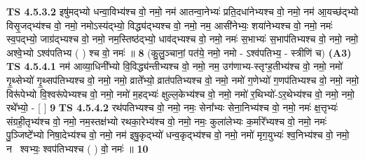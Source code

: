 \documentclass[17pt]{extarticle}
\begin{document}
                  \newline
                                \textbf{ TS 4.5.3.2} \newline
                  इषु॑मद्भ्यो धन्वा॒विभ्य॑श्च वो॒ नमो॒                  नम॑ आतन्वा॒नेभ्यः॑ प्रति॒दधा॑नेभ्यश्च वो॒ नमो॒                                     नम॑ आ॒यच्छ॑द्भ्यो विसृ॒जद्भ्य॑श्च वो॒ नमो॒   नमोऽस्य॑द्भ्यो॒ विद्ध्य॑द्भ्यश्च वो॒ नमो॒                नम॒ आसी॑नेभ्यः॒ शया॑नेभ्यश्च वो॒ नमो॒                                               नमः॑ स्व॒पद्भ्यो॒ जाग्र॑द्भ्यश्च वो॒ नमो॒                                              नम॒स्तिष्ठ॑द्भ्यो॒ धाव॑द्भ्यश्च वो॒ नमो॒     नमः॑ स॒भाभ्यः॑ स॒भाप॑तिभ्यश्च वो॒ नमो॒                                            नमो॒ अश्वे॒भ्यो ऽश्व॑पतिभ्य ( ) श्च वो॒ नमः॑ ॥ \textbf{  8} \newline
                  \newline
                      (कु॒लु॒ञ्चानां॒ पत॑ये॒ नमो॒ नमो - ऽश्व॑पतिभ्य॒ - स्त्रीणि॑ च)  \textbf{(A3)} \newline \newline
                                        \textbf{ TS 4.5.4.1} \newline
                  नम॑ आव्या॒धिनी᳚भ्यो वि॒विद्ध्य॑न्तीभ्यश्च वो॒ नमो॒                             नम॒ उग॑णाभ्य-स्तृꣳह॒तीभ्य॑श्च वो॒ नमो॒                                          नमो॑ गृ॒थ्सेभ्यो॑ गृ॒थ्सप॑तिभ्यश्च वो॒ नमो॒                                                नमो॒ व्राते᳚भ्यो॒ व्रात॑पतिभ्यश्च वो॒ नमो॒                                             नमो॑ ग॒णेभ्यो॑ ग॒णप॑तिभ्यश्च वो॒ नमो॒                                                      नमो॒ विरू॑पेभ्यो वि॒श्वरू॑पेभ्यश्च वो॒ नमो॒                                            नमो॑ म॒हद्भ्यः॑ क्षुल्ल॒केभ्य॑श्च वो॒ नमो॒                                           नमो॑ र॒थिभ्यो॑-ऽर॒थेभ्य॑श्च वो॒ नमो॒                                                       नमो॒ रथे᳚भ्यो॒ - [  ] \textbf{  9} \newline
                  \newline
                                \textbf{ TS 4.5.4.2} \newline
                  रथ॑पतिभ्यश्च वो॒ नमो॒                                                      नमः॒ सेना᳚भ्यः सेना॒निभ्य॑श्च वो॒ नमो॒                                               नमः॑ क्ष॒त्तृभ्यः॑ संग्रही॒तृभ्य॑श्च वो॒ नमो॒                                     नम॒स्तक्ष॑भ्यो रथका॒रेभ्य॑श्च वो॒ नमो॒                                                    नमः॒ कुला॑लेभ्यः क॒र्मारे᳚भ्यश्च वो॒ नमो॒                                            नमः॑ पु॒ञ्जिष्टे᳚भ्यो निषा॒देभ्य॑श्च वो॒ नमो॒                                                नम॑ इषु॒कृद्भ्यो॑ धन्व॒कृद्भ्य॑श्च वो॒ नमो॒                                                नमो॑ मृग॒युभ्यः॑ श्व॒निभ्य॑श्च वो॒ नमो॒                                                     नमः᳡श्वभ्यः॒ श्वप॑तिभ्यश्च ( ) वो॒ नमः॑ ॥ \textbf{  10} \newline
\end{document}
